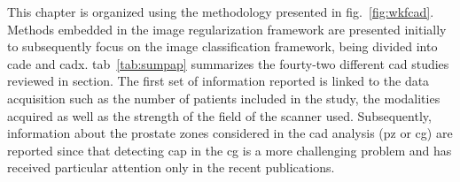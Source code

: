 


This chapter is organized using the methodology presented in \acs{fig}.~\ref{fig:wkfcad}.
Methods embedded in the image regularization framework are presented initially to subsequently focus on the image classification framework, being divided into \ac{cade} and \ac{cadx}.
\Acl{tab}~\ref{tab:sumpap} summarizes the fourty-two different \ac{cad} studies reviewed in section.
The first set of information reported is linked to the data acquisition such as the number of patients included in the study, the modalities acquired as well as the strength of the field of the scanner used.
Subsequently, information about the prostate zones considered in the \ac{cad} analysis (\ac{pz} or \ac{cg}) are reported since that detecting \ac{cap} in the \ac{cg} is a more challenging problem and has received particular attention only in the recent publications.



